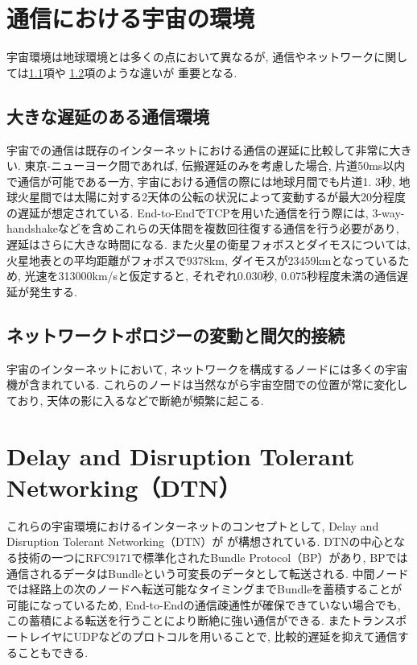 \section{通信における宇宙の環境}
\label{section:通信における宇宙の環境}
宇宙環境は地球環境とは多くの点において異なるが, 
通信やネットワークに関しては\ref{section:大きな遅延のある通信環境}項や
\ref{section:ネットワークトポロジーの変動と間欠的接続}項のような違いが
重要となる. 


\subsection{大きな遅延のある通信環境}
\label{section:大きな遅延のある通信環境}
宇宙での通信は既存のインターネットにおける通信の遅延に比較して非常に大きい. 
東京-ニューヨーク間であれば, 伝搬遅延のみを考慮した場合, 片道50ms以内で通信が可能である一方, 宇宙における通信の際には地球月間でも片道1. 3秒, 
地球火星間では太陽に対する2天体の公転の状況によって変動するが最大20分程度の遅延が想定されている. 
End-to-EndでTCPを用いた通信を行う際には,  3-way-handshakeなどを含めこれらの天体間を複数回往復する通信を行う必要があり,  
遅延はさらに大きな時間になる.  
\cite{McBrayer2022}
また火星の衛星フォボスとダイモスについては, 
火星地表との平均距離がフォボスで9378km, ダイモスが23459kmとなっているため, 
光速を313000km/sと仮定すると, それぞれ0.030秒, 0.075秒程度未満の通信遅延が発生する. 


\subsection{ネットワークトポロジーの変動と間欠的接続}
\label{section:ネットワークトポロジーの変動と間欠的接続}
宇宙のインターネットにおいて, ネットワークを構成するノードには多くの宇宙機が含まれている. 
これらのノードは当然ながら宇宙空間での位置が常に変化しており, 
 天体の影に入るなどで断絶が頻繁に起こる.  

\section{Delay and Disruption Tolerant Networking（DTN）}
これらの宇宙環境におけるインターネットのコンセプトとして, Delay and Disruption Tolerant Networking（DTN）が
が構想されている. DTNの中心となる技術の一つにRFC9171\cite{rfc9171}で標準化されたBundle Protocol（BP）があり,  
BPでは通信されるデータはBundleという可変長のデータとして転送される.  
中間ノードでは経路上の次のノードへ転送可能なタイミングまでBundleを蓄積することが可能になっているため,  
End-to-Endの通信疎通性が確保できていない場合でも,  この蓄積による転送を行うことにより断絶に強い通信ができる. 
またトランスポートレイヤにUDPなどのプロトコルを用いることで,  比較的遅延を抑えて通信することもできる. \cite{bundle_protocol_architecture}

